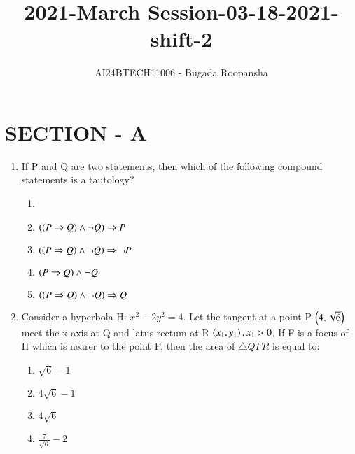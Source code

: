 \documentclass[journal,12pt,twocolumn]{IEEEtran}
\theoremstyle{remark}
\begin{document}

\vspace{3cm}
\title{2021-March Session-03-18-2021-shift-2}
\author{AI24BTECH11006 - Bugada Roopansha}
\maketitle
\section{SECTION - A}
\begin{enumerate}[start=16]
\item If P and Q are two statements, then which of the following compound statements is a tautology?
\begin{enumerate}
    \item 
\item  $\left(\left(P \Rightarrow Q\right) \land \neg Q\right) \Rightarrow P$ 
\item   $\left(\left(P \Rightarrow Q\right) \land \neg Q\right) \Rightarrow \neg P $
\item $ \left(P \Rightarrow Q\right) \land \neg Q$ 
\item  $\left(\left(P \Rightarrow Q\right) \land \neg Q\right) \Rightarrow Q $


\end{enumerate}
\item  Consider a hyperbola H: $x^2 -2y^2=4$. Let the tangent at a point P $\left(4,\sqrt{6}\right)$ meet the x-axis at Q and latus rectum at R $\left(x_1,y_1\right) ,x_1>0$. If F is a focus of H which is nearer to the point P, then the area of $\triangle{QFR}$ is equal to:
\begin{enumerate}
\item $\sqrt{6} - 1$
\item  $4\sqrt{6} - 1$
\item  $4\sqrt{6} $
\item $\frac{7}{\sqrt{6}} - 2 $



\end{enumerate}
\end{enumerate}
\end{document}
